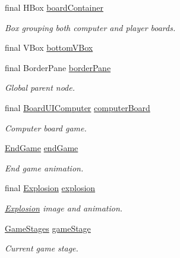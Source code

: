 \begin{DoxyCompactItemize}
\item 
final H\-Box \hyperlink{classbattleship2D_1_1ui_1_1MainFrame_a88d90d33f8f7f63c47fdbb53328d48f7}{board\-Container}
\begin{DoxyCompactList}\small\item\em Box grouping both computer and player boards. \end{DoxyCompactList}\item 
final V\-Box \hyperlink{classbattleship2D_1_1ui_1_1MainFrame_a35a81571c37a413335a40c42b837dc23}{bottom\-V\-Box}
\item 
final Border\-Pane \hyperlink{classbattleship2D_1_1ui_1_1MainFrame_a3eefc62de2e2b8ae91e7c75482d6418e}{border\-Pane}
\begin{DoxyCompactList}\small\item\em Global parent node. \end{DoxyCompactList}\item 
final \hyperlink{classbattleship2D_1_1ui_1_1BoardUIComputer}{Board\-U\-I\-Computer} \hyperlink{classbattleship2D_1_1ui_1_1MainFrame_adc56bc1d2ef21ff86f1c87d33e3e9ff1}{computer\-Board}
\begin{DoxyCompactList}\small\item\em Computer board game. \end{DoxyCompactList}\item 
\hyperlink{classbattleship2D_1_1ui_1_1EndGame}{End\-Game} \hyperlink{classbattleship2D_1_1ui_1_1MainFrame_aee190b7bfc2df5a65cfd17381df5e914}{end\-Game}
\begin{DoxyCompactList}\small\item\em End game animation. \end{DoxyCompactList}\item 
final \hyperlink{classbattleship2D_1_1ui_1_1Explosion}{Explosion} \hyperlink{classbattleship2D_1_1ui_1_1MainFrame_ae1b6ad698cc16b8a5905dfb996dfd85b}{explosion}
\begin{DoxyCompactList}\small\item\em \hyperlink{classbattleship2D_1_1ui_1_1Explosion}{Explosion} image and animation. \end{DoxyCompactList}\item 
\hyperlink{enumbattleship2D_1_1ui_1_1GameStages}{Game\-Stages} \hyperlink{classbattleship2D_1_1ui_1_1MainFrame_a0a2301fb85fa1a17ebcb5e196d441dc0}{game\-Stage}
\begin{DoxyCompactList}\small\item\em Current game stage. \end{DoxyCompactList}\item 

\end{DoxyCompactItemize}

